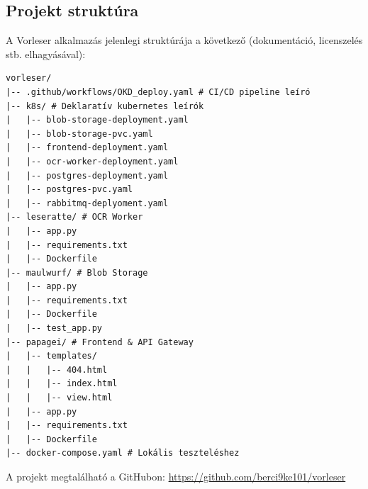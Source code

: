 \documentclass[12pt]{article}
\begin{document}
	\subsection{Projekt struktúra}
	A Vorleser alkalmazás jelenlegi struktúrája a következő (dokumentáció, licenszelés stb. elhagyásával):
	\begin{verbatim}
vorleser/
|-- .github/workflows/OKD_deploy.yaml # CI/CD pipeline leíró
|-- k8s/ # Deklaratív kubernetes leírók
|   |-- blob-storage-deployment.yaml
|   |-- blob-storage-pvc.yaml
|   |-- frontend-deployment.yaml
|   |-- ocr-worker-deployment.yaml
|   |-- postgres-deployment.yaml
|   |-- postgres-pvc.yaml
|   |-- rabbitmq-deplyoment.yaml
|-- leseratte/ # OCR Worker
|   |-- app.py
|   |-- requirements.txt
|   |-- Dockerfile
|-- maulwurf/ # Blob Storage
|   |-- app.py
|   |-- requirements.txt
|   |-- Dockerfile
|   |-- test_app.py
|-- papagei/ # Frontend & API Gateway
|   |-- templates/
|   |   |-- 404.html
|   |   |-- index.html
|   |   |-- view.html
|   |-- app.py
|   |-- requirements.txt
|   |-- Dockerfile
|-- docker-compose.yaml # Lokális teszteléshez
	\end{verbatim}
	
	A projekt megtalálható a GitHubon: \url{https://github.com/berci9ke101/vorleser}
	
\end{document}
